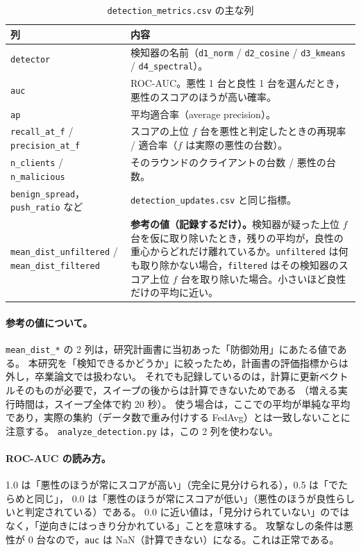 \documentclass[a4j, dvipdfmx]{jsarticle}  %
\begin{document}
\begin{table}[H]
\centering
\caption{\texttt{detection\_metrics.csv} の主な列}
\begin{tabular}{@{}P{4.4cm} P{10.9cm}@{}}
\toprule
列 & 内容 \\
\midrule
\texttt{detector} & 検知器の名前（\texttt{d1\_norm} / \texttt{d2\_cosine} / \texttt{d3\_kmeans} / \texttt{d4\_spectral}）。 \\
\texttt{auc} & ROC-AUC。悪性 1 台と良性 1 台を選んだとき，悪性のスコアのほうが高い確率。 \\
\texttt{ap} & 平均適合率（average precision）。 \\
\texttt{recall\_at\_f} / \texttt{precision\_at\_f} & スコアの上位 $f$ 台を悪性と判定したときの再現率 / 適合率（$f$ は実際の悪性の台数）。 \\
\texttt{n\_clients} / \texttt{n\_malicious} & そのラウンドのクライアントの台数 / 悪性の台数。 \\
\texttt{benign\_spread}，\texttt{push\_ratio} など & \texttt{detection\_updates.csv} と同じ指標。 \\
\texttt{mean\_dist\_unfiltered} / \texttt{mean\_dist\_filtered} & \textbf{参考の値（記録するだけ）。}検知器が疑った上位 $f$ 台を仮に取り除いたとき，残りの平均が，良性の重心からどれだけ離れているか。\texttt{unfiltered} は何も取り除かない場合，\texttt{filtered} はその検知器のスコア上位 $f$ 台を取り除いた場合。小さいほど良性だけの平均に近い。 \\
\bottomrule
\end{tabular}
\end{table}

\paragraph{参考の値について。}
\texttt{mean\_dist\_*} の 2 列は，研究計画書に当初あった「防御効用」にあたる値である。
本研究を「検知できるかどうか」に絞ったため，計画書の評価指標からは外し，卒業論文では扱わない。
それでも記録しているのは，計算に更新ベクトルそのものが必要で，スイープの後からは計算できないためである
（増える実行時間は，スイープ全体で約 20 秒）。
使う場合は，ここでの平均が単純な平均であり，実際の集約（データ数で重み付けする FedAvg）とは一致しないことに注意する。
\texttt{analyze\_detection.py} は，この 2 列を使わない。

\paragraph{ROC-AUC の読み方。}
1.0 は「悪性のほうが常にスコアが高い」（完全に見分けられる），0.5 は「でたらめと同じ」，
0.0 は「悪性のほうが常にスコアが低い」（悪性のほうが良性らしいと判定されている）である。
0.0 に近い値は，「見分けられていない」のではなく，「逆向きにはっきり分かれている」ことを意味する。
攻撃なしの条件は悪性が 0 台なので，\texttt{auc} は NaN（計算できない）になる。これは正常である。
\end{document}

